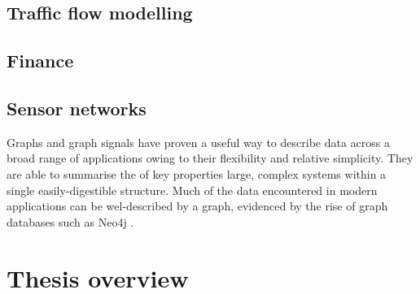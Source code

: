 \subsection{Traffic flow modelling}



\subsection{Finance}

\subsection{Sensor networks}

Graphs and graph signals have proven a useful way to describe data across a broad range of applications owing to their flexibility and relative simplicity. They are able to summarise the of key properties large, complex systems within a single easily-digestible structure. Much of the data encountered in modern applications can be wel-described by a graph, evidenced by the rise of graph databases such as Neo4j \citep{Webber2012}. 


\section{Thesis overview}

\label{sec:thesis_overview}